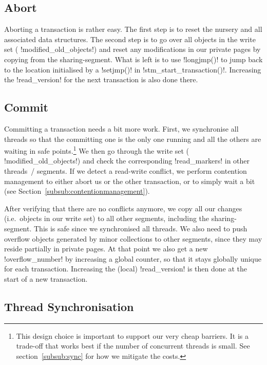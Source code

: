 \documentclass{sigplanconf}
\makeatletter
\renewcommand\lstinline[1][]{%
  \Collectverb{\@@myverb}%
}
\def\@@myverb#1{%
    \begingroup
    \fboxsep=0.2em
    \colorbox{verylightgray}{\oldlstinline|#1|}%
    \endgroup
}
\makeatother
\begin{document}
\subsection{Abort}

Aborting a transaction is rather easy. The first step is to reset the
nursery and all associated data structures. The second step is to go
over all objects in the write set (\lstinline!modified_old_objects!)
and reset any modifications in our private pages by copying from the
sharing-segment. What is left is to use \lstinline!longjmp()!  to jump
back to the location initialised by a \lstinline!setjmp()!  in
\lstinline!stm_start_transaction()!.  Increasing the
\lstinline!read_version! for the next transaction is also done there.




\subsection{Commit}

Committing a transaction needs a bit more work. First, we synchronise
all threads so that the committing one is the only one running and all
the others are waiting in safe points.\footnote{This design choice is
important to support our very cheap barriers. It is a trade-off that
works best if the number of concurrent threads is small.
See section~\ref{subsub:sync} for how we mitigate the costs.}
We then go through the write
set (\lstinline!modified_old_objects!)  and check the corresponding
\lstinline!read_markers!  in other threads~/ segments. If we detect a
read-write conflict, we perform contention management to either abort us or
the other transaction, or to simply wait a bit (see Section~\ref{subsub:contentionmanagement}).

After verifying that there are no conflicts anymore, we copy all our
changes (i.e.\ objects in our write set) to all other segments,
including the sharing-segment. This is safe since we synchronised all
threads. We also need to push overflow objects generated by minor
collections to other segments, since they may reside partially in
private pages. At that point we also get a new
\lstinline!overflow_number! by increasing a global counter, so that it
stays globally unique for each transaction. Increasing the (local)
\lstinline!read_version!  is then done at the start of a new
transaction.


\subsection{Thread Synchronisation\label{subsub:sync}}
\end{document}

